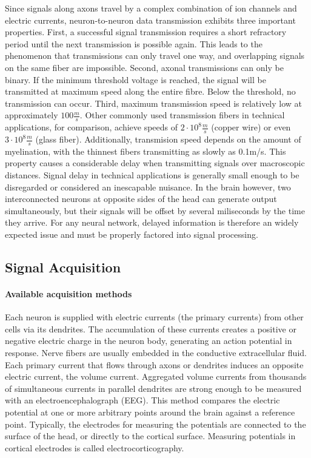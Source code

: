 Since signals along axons travel by a complex combination of ion channels and electric currents, neuron-to-neuron data transmission exhibits three important properties.
First, a successful signal transmission requires a short refractory period until the next transmission is possible again.
This leads to the phenomenon that transmissions can only travel one way, and overlapping signals on the same fiber are impossible.
Second, axonal transmissions can only be binary.
If the minimum threshold voltage is reached, the signal will be transmitted at maximum speed along the entire fibre.
Below the threshold, no transmission can occur.
Third, maximum transmission speed is relatively low at approximately $100\frac{m}{s}$.
Other commonly used transmission fibers in technical applications, for comparison, achieve speeds of $2\cdot10^8\frac{m}{s}$ (copper wire) or even $3\cdot10^8\frac{m}{s}$ (glass fiber).
Additionally, transmision speed depends on the amount of myelination, with the thinnest fibers transmitting as slowly as 0.1m/s.
This property causes a considerable delay when transmitting signals over macroscopic distances.
Signal delay in technical applications is generally small enough to be disregarded or considered an inescapable nuisance.
In the brain however, two interconnected neurons at opposite sides of the head can generate output simultaneously, but their signals will be offset by several miliseconds by the time they arrive.
For any neural network, delayed information is therefore an widely expected issue and must be properly factored into signal processing.

\subsection{Signal Acquisition}
\paragraph{Available acquisition methods}
Each neuron is supplied with electric currents (the primary currents) from other cells via its dendrites.
The accumulation of these currents creates a positive or negative electric charge in the neuron body, generating an action potential in response.
Nerve fibers are usually embedded in the conductive extracellular fluid.
Each primary current that flows through axons or dendrites induces an opposite electric current, the volume current.
Aggregated volume currents from thousands of simultaneous currents in parallel dendrites are strong enough to be measured with an electroencephalograph (EEG).
This method compares the electric potential at one or more arbitrary points around the brain against a reference point.
Typically, the electrodes for measuring the potentials are connected to the surface of the head, or directly to the cortical surface.
Measuring potentials in cortical electrodes is called electrocorticography.

